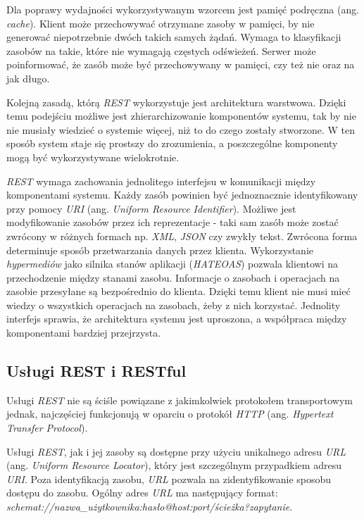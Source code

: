 Dla poprawy wydajności wykorzystywanym wzorcem jest pamięć podręczna (ang. \textsl{cache}). Klient może przechowywać otrzymane zasoby w pamięci, by nie generować niepotrzebnie dwóch takich samych żądań. Wymaga to klasyfikacji zasobów na takie, które nie wymagają częstych odświeżeń. Serwer może poinformować, że zasób może być przechowywany w pamięci, czy też nie oraz na jak długo.  

Kolejną zasadą, którą \textsl{REST} wykorzystuje jest architektura warstwowa. Dzięki temu podejściu możliwe jest zhierarchizowanie komponentów systemu, tak by nie nie musiały wiedzieć o systemie więcej, niż to do czego zostały stworzone. W ten sposób system staje się prostszy do zrozumienia, a poszczególne komponenty mogą być wykorzystywane wielokrotnie.

\textsl{REST} wymaga zachowania jednolitego interfejsu w komunikacji między komponentami systemu. Każdy zasób powinien być jednoznacznie identyfikowany przy pomocy \textsl{URI} (ang. \textsl{Uniform Resource Identifier}). Możliwe jest modyfikowanie zasobów przez ich reprezentacje - taki sam zasób może zostać zwrócony w różnych formach np. \textsl{XML}, \textsl{JSON} czy zwykły tekst. Zwrócona forma determinuje sposób przetwarzania danych przez klienta. Wykorzystanie  \textsl{hypermediów} jako silnika stanów aplikacji (\textsl{HATEOAS}) pozwala klientowi na przechodzenie między stanami zasobu. Informacje o  zasobach i operacjach na zasobie przesyłane są bezpośrednio do klienta. Dzięki temu klient nie musi mieć wiedzy o wszystkich operacjach na zasobach, żeby z nich korzystać. Jednolity interfejs sprawia, że architektura systemu jest uproszona, a współpraca między komponentami bardziej przejrzysta.
 
\subsection{Usługi REST i RESTful}
Usługi \textsl{REST} nie są ściśle powiązane z jakimkolwiek protokołem transportowym jednak, najczęściej funkcjonują w oparciu o protokół \textsl{HTTP} (ang. \textsl{Hypertext Transfer Protocol}).

Usługi \textsl{REST}, jak i jej zasoby są dostępne przy użyciu unikalnego adresu \textsl{URL} (ang. \textsl{Uniform Resource Locator}), który jest szczególnym przypadkiem adresu \textsl{URI}. Poza identyfikacją zasobu, \textsl{URL} pozwala na zidentyfikowanie sposobu dostępu do zasobu. Ogólny adres \textsl{URL} ma następujący format: \\ \textsl{schemat://nazwa\_użytkownika:hasło@host:port/ścieżka?zapytanie}. 

